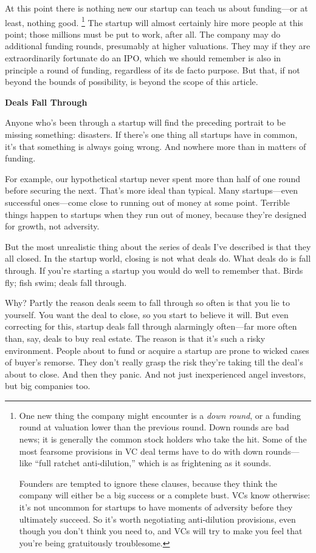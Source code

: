 \documentclass[12pt]{book}
\begin{document}
At this point there is nothing new our startup can teach us about
funding---or at least, nothing good. \footnote{One new thing the company might encounter is a \emph{down
round}, or a funding round at valuation lower than the previous round.
Down rounds are bad news; it is generally the common stock holders who
take the hit. Some of the most fearsome provisions in VC deal terms have
to do with down rounds---like ``full ratchet anti-dilution,'' which is
as frightening as it sounds.

Founders are tempted to ignore these clauses, because they think the
company will either be a big success or a complete bust. VCs know
otherwise: it's not uncommon for startups to have moments of adversity
before they ultimately succeed. So it's worth negotiating anti-dilution
provisions, even though you don't think you need to, and VCs will try to
make you feel that you're being gratuitously troublesome.} The
startup will almost certainly hire more people at this point; those
millions must be put to work, after all. The company may do additional
funding rounds, presumably at higher valuations. They may if they are
extraordinarily fortunate do an IPO, which we should remember is also in
principle a round of funding, regardless of its de facto purpose. But
that, if not beyond the bounds of possibility, is beyond the scope of
this article.

\textbf{Deals Fall Through}

Anyone who's been through a startup will find the preceding portrait to
be missing something: disasters. If there's one thing all startups have
in common, it's that something is always going wrong. And nowhere more
than in matters of funding.

For example, our hypothetical startup never spent more than half of one
round before securing the next. That's more ideal than typical. Many
startups---even successful ones---come close to running out of money at
some point. Terrible things happen to startups when they run out of
money, because they're designed for growth, not adversity.

But the most unrealistic thing about the series of deals I've described
is that they all closed. In the startup world, closing is not what deals
do. What deals do is fall through. If you're starting a startup you
would do well to remember that. Birds fly; fish swim; deals fall
through.

Why? Partly the reason deals seem to fall through so often is that you
lie to yourself. You want the deal to close, so you start to believe it
will. But even correcting for this, startup deals fall through
alarmingly often---far more often than, say, deals to buy real estate.
The reason is that it's such a risky environment. People about to fund
or acquire a startup are prone to wicked cases of buyer's remorse. They
don't really grasp the risk they're taking till the deal's about to
close. And then they panic. And not just inexperienced angel investors,
but big companies too.
\end{document}
